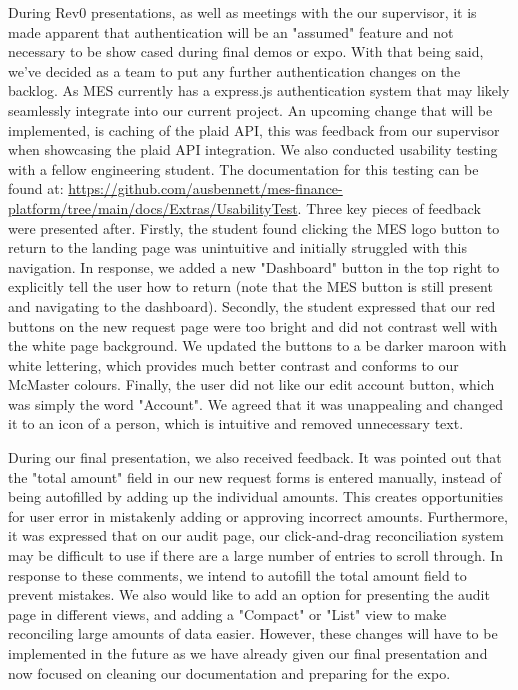 \documentclass[12pt, titlepage]{article}
\begin{document}
During Rev0 presentations, as well as meetings with the our supervisor, it is made apparent that authentication will be an "assumed" feature and not necessary to be show cased during final demos or expo. With that being said, we've decided as a team to put any further authentication changes on the backlog. As MES currently has a express.js authentication system that may likely seamlessly integrate into our current project. An upcoming change that will be implemented, is caching of the plaid API, this was feedback from our supervisor when showcasing the plaid API integration. 
We also conducted usability testing with a fellow engineering student. The documentation for this testing can be found at:
\url{https://github.com/ausbennett/mes-finance-platform/tree/main/docs/Extras/UsabilityTest}. Three key pieces of feedback were presented after. Firstly, the student found clicking the MES logo button to return to the landing page was unintuitive and initially struggled with this navigation. In response, we added a new "Dashboard" button in the top right to explicitly tell the user how to return (note that the MES button is still present and navigating to the dashboard). Secondly, the student expressed that our red buttons on the new request page were too bright and did not contrast well with the white page background. We updated the buttons to a be darker maroon with white lettering, which provides much better contrast and conforms to our McMaster colours. Finally, the user did not like our edit account button, which was simply the word "Account". We agreed that it was unappealing and changed it to an icon of a person, which is intuitive and removed unnecessary text.

During our final presentation, we also received feedback. It was pointed out that the "total amount" field in our new request forms is entered manually, instead of being autofilled by adding up the individual amounts. This creates opportunities for user error in mistakenly adding or approving incorrect amounts. Furthermore, it was expressed that on our audit page, our click-and-drag reconciliation system may be difficult to use if there are a large number of entries to scroll through. In response to these comments, we intend to autofill the total amount field to prevent mistakes. We also would like to add an option for presenting the audit page in different views, and adding a "Compact" or "List" view to make reconciling large amounts of data easier. However, these changes will have to be implemented in the future as we have already given our final presentation and now focused on cleaning our documentation and preparing for the expo.
\end{document}
